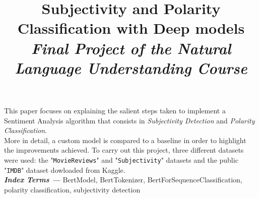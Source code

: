 \documentclass[a4paper, 8pt]{article}
\title{\LARGE{Subjectivity and Polarity Classification with Deep models}\\
\large{\textit{Final Project of the Natural Language Understanding Course}}}
\begin{document}
\maketitle

    This paper focuses on explaining the salient steps taken to implement a Sentiment Analysis algorithm that consists in \textit{Subjectivity Detection} and 
    \textit{Polarity Classification}.\\
    More in detail, a custom model is compared to a baseline in order to highlight the improvements achieved. To carry out this project, three different datasets were used: 
    the "\texttt{MovieReviews}" and  "\texttt{Subjectivity}" datasets and the public "\texttt{IMDB}" dataset dowloaded from Kaggle\cite{kaggle}.\\


\textbf{\textit{Index Terms ---}} BertModel, BertTokenizer, BertForSequenceClassification, polarity classification, subjectivity detection











\end{document}
